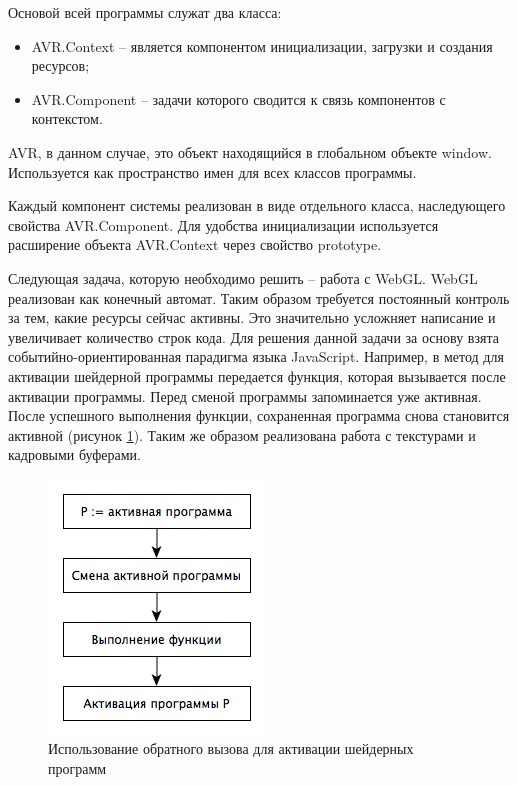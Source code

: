 Основой всей программы служат два класса: 

\begin{itemize}
  \item AVR.Context -- является компонентом инициализации, загрузки и создания ресурсов;
  \item AVR.Component -- задачи которого сводится к связь компонентов с контекстом.
\end{itemize}

AVR, в данном случае, это объект находящийся в глобальном объекте window. Используется 
как пространство имен для всех классов программы. 

Каждый компонент системы реализован в виде отдельного класса, наследующего свойства 
AVR.Component. Для удобства инициализации используется расширение объекта AVR.Context
через свойство prototype.


Следующая задача, которую необходимо решить -- работа с WebGL. WebGL реализован как конечный
автомат. Таким образом требуется постоянный контроль за тем, какие ресурсы сейчас активны. Это
значительно усложняет написание и увеличивает количество строк кода. Для решения данной задачи
за основу взята событийно-ориентированная парадигма языка JavaScript. 
Например, в метод для активации шейдерной программы передается функция, которая
вызывается после активации программы. Перед сменой программы запоминается уже активная. 
После успешного выполнения функции, сохраненная программа снова становится активной (рисунок \ref{fig:callback}).
Таким же образом реализована работа с текстурами и кадровыми буферами.

\begin{figure}
\begin{center}
  \includegraphics[scale=1]{Figures/callback}
\end{center}
\caption{Использование обратного вызова для активации шейдерных программ}
\label{fig:callback}
\end{figure}


